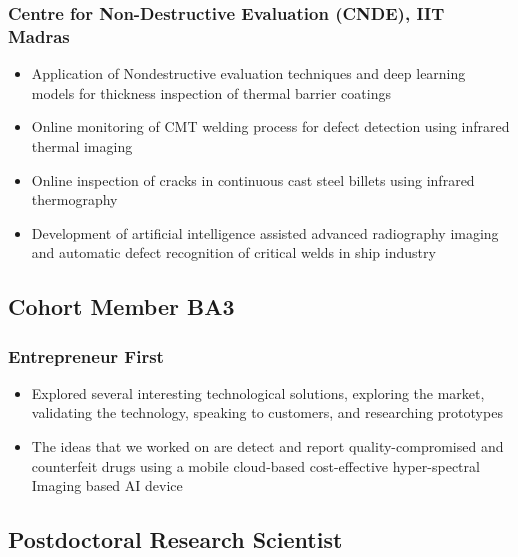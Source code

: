 \documentclass{my_cv}%
\begin{document}
\subsubsection{Centre for Non-Destructive Evaluation (CNDE), IIT Madras}
\begin{itemize}[leftmargin=0.15in]
\setlength\itemsep{-0.1em}
\color{mygray}
\item Application of Nondestructive evaluation techniques and deep learning models for thickness inspection of thermal barrier coatings
\item Online monitoring of CMT welding process for defect detection using infrared thermal imaging
\item Online inspection of cracks in continuous cast steel billets using infrared thermography
\item Development of artificial intelligence assisted advanced radiography imaging and automatic defect recognition of critical welds in ship industry
\end{itemize}%
{\color{mygray1} \hdashrule[0.1ex]{18.8cm}{0.2mm}{1mm}}
\subsection{Cohort Member BA3}
\subsubsection{Entrepreneur First}
\begin{itemize}[leftmargin=0.15in]
\setlength\itemsep{-0.1em}
\color{mygray}
\item Explored several interesting technological solutions, exploring the market, validating the technology, speaking to customers, and researching prototypes
\item The ideas that we worked on are detect and report quality-compromised and counterfeit drugs using a mobile cloud-based cost-effective hyper-spectral Imaging based AI device
\end{itemize}
{\color{mygray1} \hdashrule[0.1ex]{18.8cm}{0.2mm}{1mm}}
\subsection{Postdoctoral Research Scientist}
\end{document}
